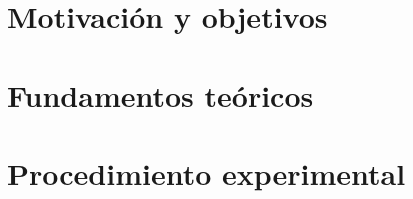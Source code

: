 \documentclass[spanish,a4paper,11pt,twoside]{report}
\begin{document}
\pagestyle{myheadings} %

\renewcommand{\thepage}{\roman{page}}
\setcounter{page}{1}


\tableofcontents

\newpage{\pagestyle{empty}\cleardoublepage}

\listoffigures

\newpage{\pagestyle{empty}\cleardoublepage}

\listoftables

\newpage{\pagestyle{empty}\cleardoublepage}

\renewcommand{\thepage}{\arabic{page}}
\setcounter{page}{1}

\setlength{\parindent}{5mm}

\chapter{Motivación y objetivos}
\label{chapter:obj}



\chapter{Fundamentos teóricos}
\label{chapter:teo}



\chapter{Procedimiento experimental}
\label{chapter:exp}
\end{document}
